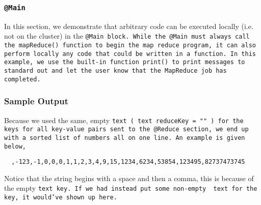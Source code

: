 \documentclass{article} \usepackage{fancyhdr, multicol}
\begin{document}
\subsubsection*{\tt @Main \rm}

In this section, we demonstrate that arbitrary code can be executed locally (i.e.
not on the cluster) in the \tt @Main \rm block. While the \tt @Main \rm must always
call the \tt mapReduce() \rm function to begin the map reduce program, it can also
perform locally any code that could be written in a function. In this example, we
use the built-in function \tt print() \rm to print messages to standard out and let
the user know that the MapReduce job has completed.

\subsubsection*{Sample Output}

Because we used the same, empty \tt text \rm ( \tt text reduceKey = "" \rm) for the
keys for all key-value pairs sent to the \tt @Reduce \rm section, we end up with a
sorted list of numbers all on one line. An example is given below,

\begin{verbatim}
  ,-123,-1,0,0,0,1,1,2,3,4,9,15,1234,6234,53854,123495,82737473745
\end{verbatim}

\noindent Notice that the string begins with a space and then a comma, this is
because of the empty \tt text \rm key. If we had instead put some non-empty \tt
text \rm for the key, it would've shown up here.
\end{document}
